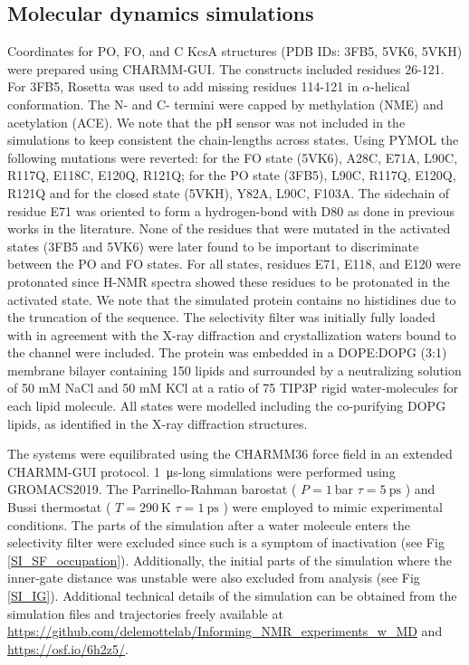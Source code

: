 \documentclass[%
 aip,
 amsmath,amssymb,
 preprint,%
]{revtex4-1}
\begin{document}
\subsection{Molecular dynamics simulations}
Coordinates for PO, FO, and C KcsA structures (PDB IDs: 3FB5, 5VK6, 5VKH)\cite{Cuello2010,Cuello2017} were prepared using CHARMM-GUI\cite{Jo2017}. The constructs included residues 26-121. For 3FB5, Rosetta\cite{DiMaio2011} was used to add missing residues 114-121 in $\alpha$-helical conformation. The N- and C- termini were capped by methylation (NME) and acetylation (ACE). We note that the pH sensor was not included in the simulations to keep consistent the chain-lengths across states. Using PYMOL\cite{PyMOL} the following mutations were reverted: for the FO state (5VK6), A28C, E71A, L90C, R117Q, E118C, E120Q, R121Q; for the PO state (3FB5), L90C, R117Q, E120Q, R121Q and for the closed state (5VKH), Y82A, L90C, F103A. The sidechain of residue E71 was oriented to form a hydrogen-bond with D80 as done in previous works in the literature\cite{Li2018}. None of the residues that were mutated in the activated states (3FB5 and 5VK6) were later found to be important to discriminate between the PO and FO states. For all states, residues E71, E118, and E120 were protonated since H-NMR spectra showed these residues to be protonated in the activated state.\cite{Bhate2012,Wylie2014} We note that the simulated protein contains no histidines due to the truncation of the sequence. The selectivity filter was initially fully loaded with  in agreement with the X-ray diffraction and crystallization waters bound to the channel were included. The protein was embedded in a DOPE:DOPG (3:1) membrane bilayer containing 150 lipids and surrounded by a neutralizing solution of 50 mM NaCl and 50 mM KCl at a ratio of 75 TIP3P\cite{TIP3P_JChemPhys_Jorgensen_1983} rigid water-molecules for each lipid molecule. All states were modelled including the co-purifying DOPG lipids, as identified in the X-ray diffraction structures. 

The systems were equilibrated using the CHARMM36 force field\cite{Best2012} in an extended CHARMM-GUI protocol. \SI{1}{\micro\second}-long simulations were performed using GROMACS2019\cite{GROMACS_Abraham2015}. The Parrinello-Rahman barostat\cite{Parrinello1981} ( $P=\SI{1}{\bar}$ $\tau = \SI{5}{\pico\second}$  ) and Bussi thermostat\cite{Bussi2007} ( $T=\SI{290}{\kelvin}$ $\tau = \SI{1}{\pico\second}$  ) were employed to mimic experimental conditions. The parts of the simulation after a water molecule enters the selectivity filter were excluded since such is a symptom of inactivation (see Fig \ref{SI_SF_occupation})\cite{Furini2020}. Additionally, the initial parts of the simulation where the inner-gate distance was unstable were also excluded from analysis (see Fig \ref{SI_IG}). Additional technical details of the simulation can be obtained from the simulation files and trajectories freely available at \url{https://github.com/delemottelab/Informing_NMR_experiments_w_MD} and \url{https://osf.io/6h2z5/}. 
\end{document}
